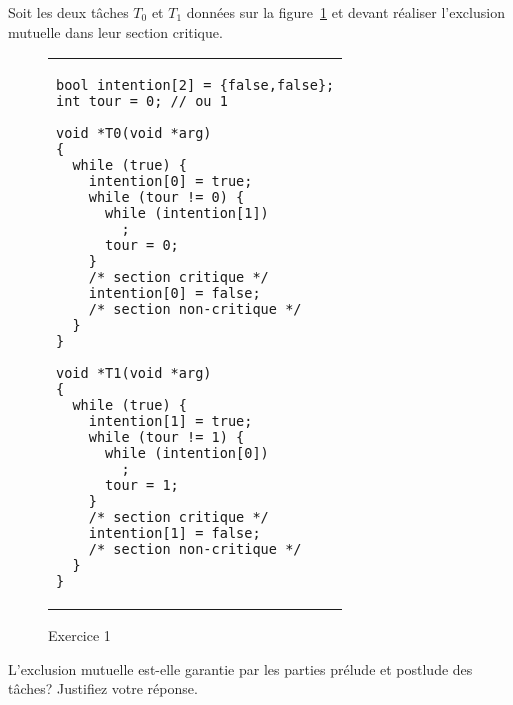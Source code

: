 \startexercice

Soit les deux tâches $T_0$ et $T_1$ données sur la figure~\ref{algex:Exercice1} et devant réaliser l'exclusion mutuelle dans leur section critique.
\begin{figure}[!ht]

  \centering
  \begin{tabular}{l}
    \lstset{language=C++}
    \begin{lstlisting}
bool intention[2] = {false,false};
int tour = 0; // ou 1

void *T0(void *arg)
{
  while (true) {
    intention[0] = true;
    while (tour != 0) {
      while (intention[1])
        ;
      tour = 0;
    }
    /* section critique */
    intention[0] = false;
    /* section non-critique */
  }
}

void *T1(void *arg)
{
  while (true) {
    intention[1] = true;
    while (tour != 1) {
      while (intention[0])
        ;
      tour = 1;
    }
    /* section critique */
    intention[1] = false;
    /* section non-critique */
  }
}
\end{lstlisting}
  \end{tabular}
  \caption{\label{algex:Exercice1}Exercice 1}

\end{figure}
L'exclusion mutuelle est-elle garantie par les parties prélude et postlude des tâches? Justifiez votre réponse.
